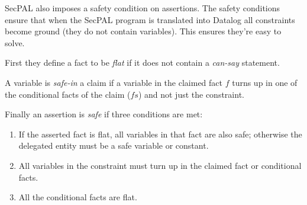 \documentclass[a4paper,sfsidenotes]{%
  scrartcl%
}
\begin{document}
SecPAL also imposes a safety condition on assertions.  The safety conditions
ensure that when the SecPAL program is translated into Datalog all constraints
become ground (they do not contain variables).  This ensures they're easy to
solve. 

First they define a fact to be \emph{flat} if it does not contain a
\emph{can-say} statement.

\begin{algorithm}[H]
\end{algorithm}

A variable is \emph{safe-in} a claim if a variable in the claimed fact $f$ turns up in one of the
conditional facts of the claim ($fs$) and not just the constraint.

\begin{algorithm}[H]
\end{algorithm}

Finally an assertion is \emph{safe} if three conditions are met:

\begin{enumerate}
  \item If the asserted fact is flat, all variables in that fact are also safe;
    otherwise the delegated entity must be a safe variable or constant.
  \item All variables in the constraint must turn up in the claimed fact or
    conditional facts.
  \item All the conditional facts are flat.
\end{enumerate}
\end{document}
